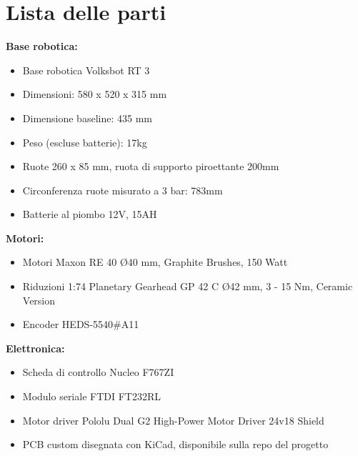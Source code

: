 \chapter{Lista delle parti}

\textbf{Base robotica:}
\begin{itemize}
    \item Base robotica Volksbot RT 3
    \item Dimensioni: 580 x 520 x 315 mm
    \item Dimensione baseline: 435 mm
    \item Peso (escluse batterie): 17kg
    \item Ruote 260 x 85 mm, ruota di supporto piroettante 200mm
    \item Circonferenza ruote misurato a 3 bar: 783mm
    \item Batterie al piombo 12V, 15AH
\end{itemize}
\textbf{Motori:}
\begin{itemize}
    \item Motori Maxon RE 40 Ø40 mm, Graphite Brushes, 150 Watt
    \item Riduzioni 1:74 Planetary Gearhead GP 42 C Ø42 mm, 3 - 15 Nm, Ceramic Version
    \item Encoder HEDS-5540\#A11
\end{itemize}
\textbf{Elettronica:}
\begin{itemize}
    \item Scheda di controllo Nucleo F767ZI
    \item Modulo seriale FTDI FT232RL
    \item Motor driver Pololu Dual G2 High-Power Motor Driver 24v18 Shield
    \item PCB custom disegnata con KiCad, disponibile sulla repo del progetto
\end{itemize}